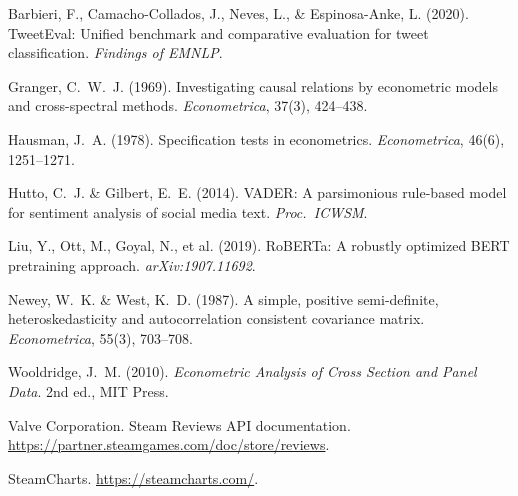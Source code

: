 \documentclass[11pt, letterpaper]{article}
\begin{document}
\begin{enumerate}[nosep, label={[\arabic*]}]
    \item Barbieri, F., Camacho-Collados, J., Neves, L., \& Espinosa-Anke, L. (2020). TweetEval: Unified benchmark and comparative evaluation for tweet classification. \textit{Findings of EMNLP}.
    \item Granger, C.~W.~J. (1969). Investigating causal relations by econometric models and cross-spectral methods. \textit{Econometrica}, 37(3), 424--438.
    \item Hausman, J.~A. (1978). Specification tests in econometrics. \textit{Econometrica}, 46(6), 1251--1271.
    \item Hutto, C.~J. \& Gilbert, E.~E. (2014). VADER: A parsimonious rule-based model for sentiment analysis of social media text. \textit{Proc.\ ICWSM}.
    \item Liu, Y., Ott, M., Goyal, N., et al. (2019). RoBERTa: A robustly optimized BERT pretraining approach. \textit{arXiv:1907.11692}.
    \item Newey, W.~K. \& West, K.~D. (1987). A simple, positive semi-definite, heteroskedasticity and autocorrelation consistent covariance matrix. \textit{Econometrica}, 55(3), 703--708.
    \item Wooldridge, J.~M. (2010). \textit{Econometric Analysis of Cross Section and Panel Data}. 2nd ed., MIT Press.
    \item Valve Corporation. Steam Reviews API documentation. \url{https://partner.steamgames.com/doc/store/reviews}.
    \item SteamCharts. \url{https://steamcharts.com/}.
\end{enumerate}
\end{document}
